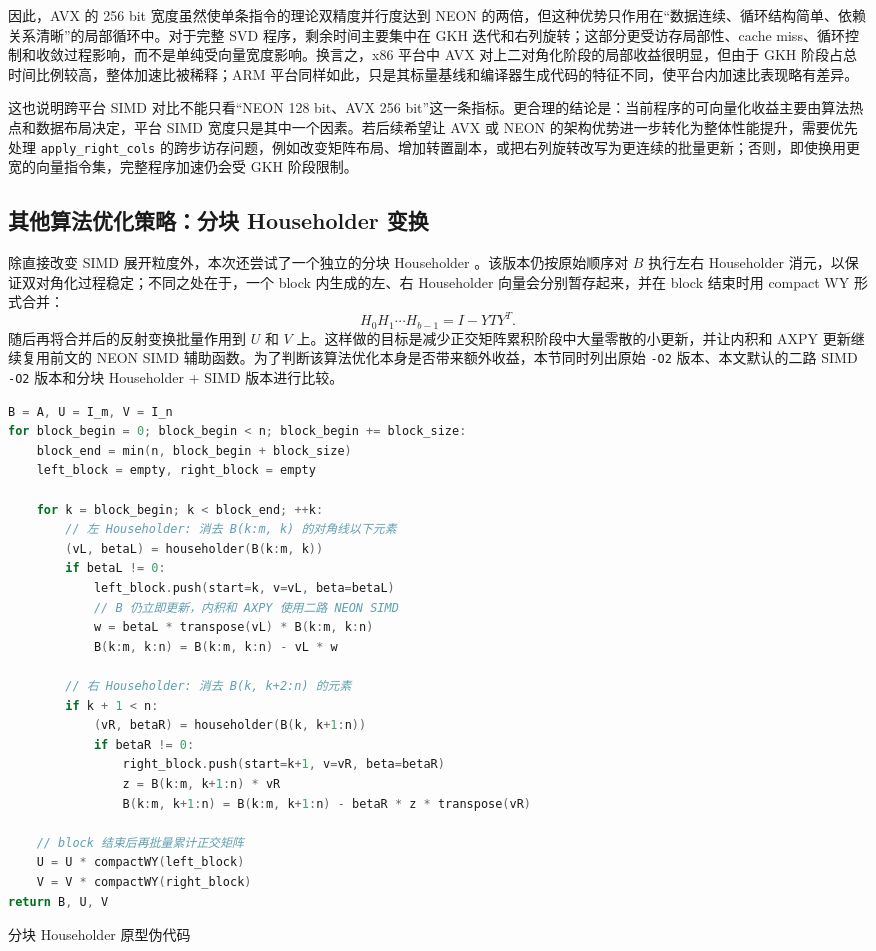 \documentclass[UTF8,a4paper]{ctexart}
\begin{document}
因此，AVX 的 256 bit 宽度虽然使单条指令的理论双精度并行度达到 NEON 的两倍，但这种优势只作用在“数据连续、循环结构简单、依赖关系清晰”的局部循环中。对于完整 SVD 程序，剩余时间主要集中在 GKH 迭代和右列旋转；这部分更受访存局部性、cache miss、循环控制和收敛过程影响，而不是单纯受向量宽度影响。换言之，x86 平台中 AVX 对上二对角化阶段的局部收益很明显，但由于 GKH 阶段占总时间比例较高，整体加速比被稀释；ARM 平台同样如此，只是其标量基线和编译器生成代码的特征不同，使平台内加速比表现略有差异。

这也说明跨平台 SIMD 对比不能只看“NEON 128 bit、AVX 256 bit”这一条指标。更合理的结论是：当前程序的可向量化收益主要由算法热点和数据布局决定，平台 SIMD 宽度只是其中一个因素。若后续希望让 AVX 或 NEON 的架构优势进一步转化为整体性能提升，需要优先处理 \texttt{apply\_right\_cols} 的跨步访存问题，例如改变矩阵布局、增加转置副本，或把右列旋转改写为更连续的批量更新；否则，即使换用更宽的向量指令集，完整程序加速仍会受 GKH 阶段限制。

\subsection{其他算法优化策略：分块 Householder 变换}
除直接改变 SIMD 展开粒度外，本次还尝试了一个独立的分块 Householder 。该版本仍按原始顺序对 \(B\) 执行左右 Householder 消元，以保证双对角化过程稳定；不同之处在于，一个 block 内生成的左、右 Householder 向量会分别暂存起来，并在 block 结束时用 compact WY 形式合并：
\[
  H_0H_1\cdots H_{b-1}=I-YTY^T.
\]
随后再将合并后的反射变换批量作用到 \(U\) 和 \(V\) 上。这样做的目标是减少正交矩阵累积阶段中大量零散的小更新，并让内积和 AXPY 更新继续复用前文的 NEON SIMD 辅助函数。为了判断该算法优化本身是否带来额外收益，本节同时列出原始 \texttt{-O2} 版本、本文默认的二路 SIMD \texttt{-O2} 版本和分块 Householder + SIMD 版本进行比较。

\begin{algorithm}[H]
\begin{lstlisting}[language=C++]
B = A, U = I_m, V = I_n
for block_begin = 0; block_begin < n; block_begin += block_size:
    block_end = min(n, block_begin + block_size)
    left_block = empty, right_block = empty

    for k = block_begin; k < block_end; ++k:
        // 左 Householder: 消去 B(k:m, k) 的对角线以下元素
        (vL, betaL) = householder(B(k:m, k))
        if betaL != 0:
            left_block.push(start=k, v=vL, beta=betaL)
            // B 仍立即更新，内积和 AXPY 使用二路 NEON SIMD
            w = betaL * transpose(vL) * B(k:m, k:n)
            B(k:m, k:n) = B(k:m, k:n) - vL * w

        // 右 Householder: 消去 B(k, k+2:n) 的元素
        if k + 1 < n:
            (vR, betaR) = householder(B(k, k+1:n))
            if betaR != 0:
                right_block.push(start=k+1, v=vR, beta=betaR)
                z = B(k:m, k+1:n) * vR
                B(k:m, k+1:n) = B(k:m, k+1:n) - betaR * z * transpose(vR)

    // block 结束后再批量累计正交矩阵
    U = U * compactWY(left_block)
    V = V * compactWY(right_block)
return B, U, V
\end{lstlisting}
\caption{分块 Householder 原型伪代码}
\label{alg:block-householder}
\end{algorithm}
\end{document}
